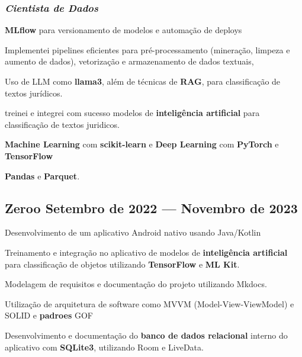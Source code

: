 \documentclass[a4paper,12pt]{article}
\begin{document}
\subsubsection*{\normalsize \textit{Cientista de Dados}}
\vspace{-1em}
\vspace{-0.5em}
\begin{zitemize}
    \item \textbf{MLflow} para versionamento de modelos e automação de deploys
    \item Implementei pipelines eficientes para pré-processamento (mineração, limpeza e aumento de dados), vetorização e armazenamento de dados textuais,
    \item Uso de LLM como \textbf{llama3}, além de técnicas de \textbf{RAG}, para classificação de textos jurídicos.
    \item treinei e integrei com sucesso modelos de \textbf{inteligência artificial} para classificação de textos juridicos.
    \item \textbf{Machine Learning} com \textbf{ scikit-learn} e \textbf{Deep Learning} com \textbf{PyTorch} e  \textbf{TensorFlow}
    \item \textbf{Pandas} e \textbf{Parquet}.
\end{zitemize}

\vspace{1.5em}
\vspace*{7pt}
\vspace{1.5em}

\subsection*{\large Zeroo \hfill Setembro de 2022 --- Novembro de 2023}

\vspace{-0.5em}
\begin{zitemize}
    \item Desenvolvimento de um aplicativo Android nativo usando Java/Kotlin
    \item Treinamento e integração no aplicativo de modelos de \textbf{inteligência artificial} para classificação de objetos utilizando \textbf{TensorFlow} e \textbf{ML Kit}.  
    \item Modelagem de requisitos e documentação do projeto utilizando Mkdocs.
    \item Utilização de arquitetura de software como MVVM (Model-View-ViewModel) e SOLID e \textbf{padroes} GOF
    \item Desenvolvimento e documentação do \textbf{banco de dados relacional} interno do aplicativo com \textbf{SQLite3}, utilizando Room e LiveData.
\end{zitemize}
\end{document}

